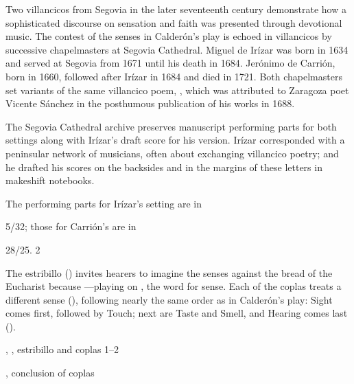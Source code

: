 Two villancicos from Segovia in the later seventeenth century demonstrate how a sophisticated discourse on sensation and faith was presented through devotional music.
The contest of the senses in Calderón's play is echoed in villancicos by successive chapelmasters at Segovia Cathedral.
Miguel de Irízar was born in 1634 and served at Segovia from 1671 until his death in 1684.
Jerónimo de Carrión, born in 1660, followed after Irízar in 1684 and died in 1721.
Both chapelmasters set variants of the same villancico poem, , which was attributed to Zaragoza poet Vicente Sánchez in the posthumous publication of his works in 1688.

The Segovia Cathedral archive preserves manuscript performing parts for both settings along with Irízar's draft score for his version.
Irízar corresponded with a peninsular network of musicians, often about exchanging villancico poetry; and he drafted his scores on the backsides and in the margins of these letters in makeshift notebooks.
\begin{Footnote}
    The performing parts for Irízar's setting are in \signature{E-SE}{5/32}; those for Carrión's are in \signature{E-SE}{28/25}.
2\end{Footnote}

The estribillo () invites hearers to imagine the senses  against the bread of the Eucharist because ---playing on , the word for sense.
Each of the coplas treats a different sense (), following nearly the same order as in Calderón's play: 
Sight comes first, followed by Touch; next are Taste and Smell, and Hearing comes last ().

\begin{expoem}
    \caption{, , estribillo and coplas 1--2}
    \label{expoem:Si_los_sentidos-Sanchez-estribillo}
\end{expoem}
\begin{expoem}
    \caption{, conclusion of coplas}
    \label{expoem:Si_los_sentidos-Sanchez-coplas}
\end{expoem}


